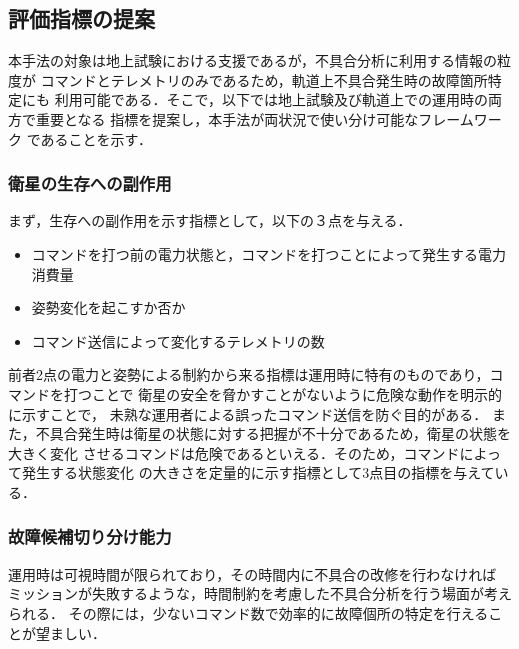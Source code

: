\documentclass[11pt]{jsarticle}%
\begin{document}
\begin{multicols}{2}
\vspace{-1zh}
\subsection{評価指標の提案}
本手法の対象は地上試験における支援であるが，不具合分析に利用する情報の粒度が
コマンドとテレメトリのみであるため，軌道上不具合発生時の故障箇所特定にも
利用可能である．そこで，以下では地上試験及び軌道上での運用時の両方で重要となる
指標を提案し，本手法が両状況で使い分け可能なフレームワーク%
であることを示す．
\vspace{-1zh}
  \subsubsection{衛星の生存への副作用}
  まず，生存への副作用を示す指標として，以下の３点を与える．
  \begin{itemize}
    \item コマンドを打つ前の電力状態と，コマンドを打つことによって発生する電力消費量
    \item 姿勢変化を起こすか否か
    \item コマンド送信によって変化するテレメトリの数
  \end{itemize}
  前者2点の電力と姿勢による制約から来る指標は運用時に特有のものであり，コマンドを打つことで
  衛星の安全を脅かすことがないように危険な動作を明示的に示すことで，
  未熟な運用者による誤ったコマンド送信を防ぐ目的がある．
  また，不具合発生時は衛星の状態に対する把握が不十分であるため，衛星の状態を大きく変化
  させるコマンドは危険であるといえる．そのため，コマンドによって発生する状態変化
  の大きさを定量的に示す指標として3点目の指標を与えている．
\vspace{-1zh}
\subsubsection{故障候補切り分け能力}
  運用時は可視時間が限られており，その時間内に不具合の改修を行わなければ
  ミッションが失敗するような，時間制約を考慮した不具合分析を行う場面が考えられる．
  その際には，少ないコマンド数で効率的に故障個所の特定を行えることが望ましい．
  


\end{multicols}
\end{document}
